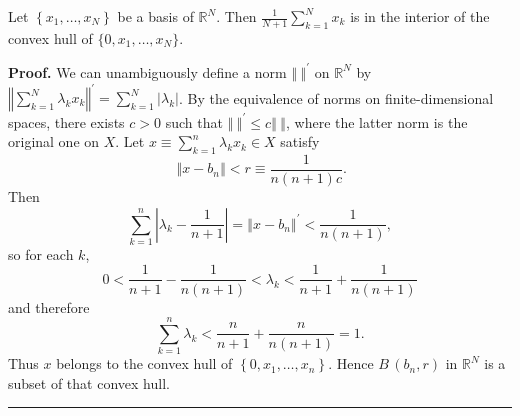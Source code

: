 \documentclass[10pt,a4paper]{amsart}
\newenvironment{proof}[1][Proof]{\noindent\textbf{#1.} }{\ \rule{0.5em}{0.5em}}
\begin{document}
\begin{lemma}
\label{0105a3}Let $\left\{  x_{1},\ldots,x_{N}\right\}  $ be a basis of
$\mathbb{R}^{N}$. Then $\tfrac{1}{N+1}%
{\textstyle\sum_{k=1}^{N}}
x_{k}$ is in the interior of the convex hull of $\{0,x_{1},\ldots,x_{N}\}$.
\end{lemma}

\begin{proof}
We can unambiguously define a norm $\left\Vert \ \right\Vert ^{\prime}$ on
$\mathbb{R}^{N}$ by $\left\Vert \sum_{k=1}^{N}\lambda_{k}x_{k}\right\Vert
^{\prime}=\sum_{k=1}^{N}\left\vert \lambda_{k}\right\vert $. By the
equivalence of norms on finite-dimensional spaces, there exists $c>0$ such
that $\left\Vert \ \right\Vert ^{\prime}\leqslant c\left\Vert \ \right\Vert $,
where the latter norm is the original one on $X$. Let $x\equiv\sum_{k=1}%
^{n}\lambda_{k}x_{k}\in X$ satisfy%
\[
\ \left\Vert x-b_{n}\right\Vert <r\equiv\frac{1}{n(n+1)c}.
\]
Then%
\[
\sum_{k=1}^{n}\left\vert \lambda_{k}-\frac{1}{n+1}\right\vert =\left\Vert
x-b_{n}\right\Vert ^{\prime}<\frac{1}{n(n+1)},
\]
so for each $k$,%
\[
0<\frac{1}{n+1}-\frac{1}{n(n+1)}<\lambda_{k}<\frac{1}{n+1}+\frac{1}{n(n+1)}%
\]
and therefore%
\[
\sum_{k=1}^{n}\lambda_{k}<\frac{n}{n+1}+\frac{n}{n(n+1)}=1.
\]
Thus $x$ belongs to the convex hull of $\left\{  0,x_{1},\ldots,x_{n}\right\}
$. Hence $B\,(b_{n},r)$ in $\mathbb{R}^{N}$ is a subset of that convex hull.
\end{proof}
\end{document}
